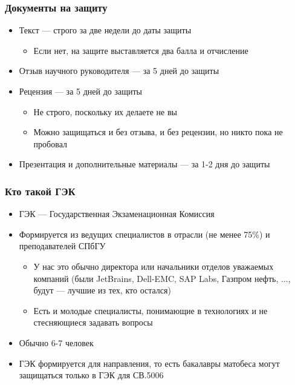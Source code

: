 \documentclass{../../slides-style}
\begin{document}
    \begin{frame}
        \frametitle{Документы на защиту}
        \begin{itemize}
            \item Текст --- строго за две недели до даты защиты
            \begin{itemize}
                \item Если нет, на защите выставляется два балла и отчисление
            \end{itemize}
            \item Отзыв научного руководителя --- за 5 дней до защиты
            \item Рецензия --- за 5 дней до защиты
            \begin{itemize}
                \item Не строго, поскольку их делаете не вы
                \item Можно защищаться и без отзыва, и без рецензии, но никто пока не пробовал
            \end{itemize}
            \item Презентация и дополнительные материалы --- за 1-2 дня до защиты
        \end{itemize}
    \end{frame}

    \begin{frame}
        \frametitle{Кто такой ГЭК}
        \begin{itemize}
            \item ГЭК --- Государственная Экзаменационная Комиссия
            \item Формируется из ведущих специалистов в отрасли (не менее 75\%) и преподавателей СПбГУ
            \begin{itemize}
                \item У нас это обычно директора или начальники отделов уважаемых компаний (были JetBrains, Dell-EMC, SAP Labs, Газпром нефть, ..., будут --- лучшие из тех, кто остался)
                \item Есть и молодые специалисты, понимающие в технологиях и не стесняющиеся задавать вопросы
            \end{itemize}
            \item Обычно 6-7 человек
            \item ГЭК формируется для направления, то есть бакалавры матобеса могут защищаться только в ГЭК для СВ.5006
        \end{itemize}
    \end{frame}
\end{document}

